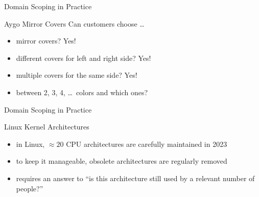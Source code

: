 
\begin{frame}{Domain Scoping in Practice}
	\begin{fancycolumns}[widths={70},animation=none]
		\centering{}
	\nextcolumn
		\begin{example}{Aygo Mirror Covers}
			Can customers choose \ldots
			\begin{itemize}
				\item mirror covers? Yes!
				\item different covers for left and right side? Yes!
				\item multiple covers for the same side? Yes!
				\item between 2, 3, 4, \ldots\ colors and which ones?
			\end{itemize}
		\end{example}
	\end{fancycolumns}
\end{frame}

\begin{frame}{Domain Scoping in Practice}
	\begin{fancycolumns}[widths={70},animation=none]
		\centering{}
	\nextcolumn
		\begin{example}{Linux Kernel Architectures}
			\begin{itemize}
				\item in Linux, $\approx 20$ CPU architectures are carefully maintained in 2023
				\item to keep it manageable, obsolete architectures are regularly removed
				\item requires an answer to ``is this architecture still used by a relevant number of people?''
			\end{itemize}
		\end{example}
	\end{fancycolumns}
\end{frame}

